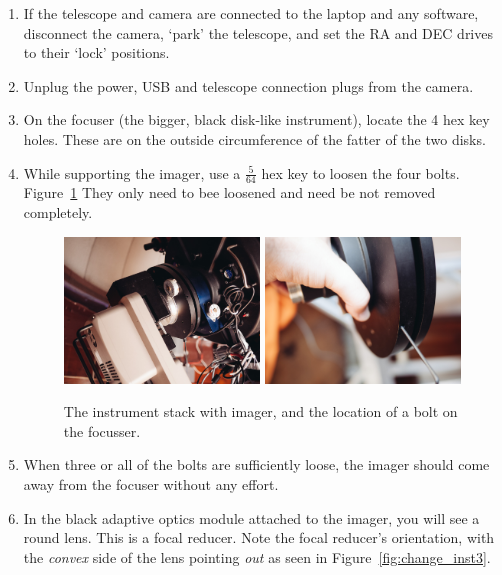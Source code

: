 \documentclass[12pt,twoside,a4paper]{report}
\begin{document}
\begin{enumerate}
 \item If the telescope and camera are connected to the laptop and any software, disconnect the camera, `park' the telescope, and set the RA and DEC drives to their `lock' positions.
 \item Unplug the power, USB and telescope connection plugs from the camera.
 \item On the focuser (the bigger, black disk-like instrument), locate the 4 hex key holes. These are on the outside circumference of the fatter of the two disks.
 \item While supporting the imager, use a $\frac{5}{64}$ hex key to loosen the four bolts. Figure~\ref{fig:change_inst1} They only need to bee loosened and need be not removed completely.

\begin{figure}[ht]
  \centering
    \includegraphics[width=0.49\textwidth]{documentation_images/change_inst1.jpg}
    \includegraphics[width=0.49\textwidth]{documentation_images/change_inst2.jpg}
    \caption{\label{fig:change_inst1} The instrument stack with imager, and the location of a bolt on the focusser.}
 \end{figure}

 \item When three or all of the bolts are sufficiently loose, the imager should come away from the focuser without any effort.
 \item In the black adaptive optics module attached to the imager, you will see a round lens. This is a focal reducer. Note the focal reducer's orientation, with the \emph{convex} side of the lens pointing \emph{out} as seen in Figure~\ref{fig:change_inst3}.


\end{enumerate}
\end{document}
